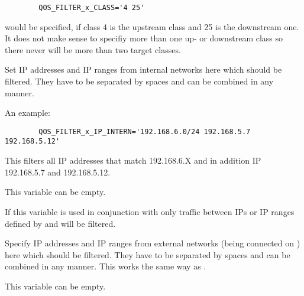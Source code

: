 \begin{description}
\begin{example}
\begin{verbatim}
        QOS_FILTER_x_CLASS='4 25'
\end{verbatim}
\end{example}

   would be specified, if class 4 is the upstream class and 25 is the downstream
   one. It does not make sense to specifiy more than one up- or downstream class
   so there never will be more than two target classes.


   Set IP addresses and IP ranges from internal networks here which should be
   filtered. They have to be separated by spaces and can be combined in any
   manner.

   An example:

\begin{example}
\begin{verbatim}
        QOS_FILTER_x_IP_INTERN='192.168.6.0/24 192.168.5.7 192.168.5.12'
\end{verbatim}
\end{example}

   This filters all IP addresses that match 192.168.6.X and in addition
   IP 192.168.5.7 and 192.168.5.12.

   This variable can be empty.

   If this variable is used in conjunction with 
   only traffic between IPs or IP ranges defined by 
   and  will be filtered.

   \sloppypar{}



   Specify IP addresses and IP ranges from external networks (being connected on
   ) here which should be filtered. They have to be
   separated by spaces and can be combined in any manner. This works the same
   way as .

   This variable can be empty.


\end{description}

